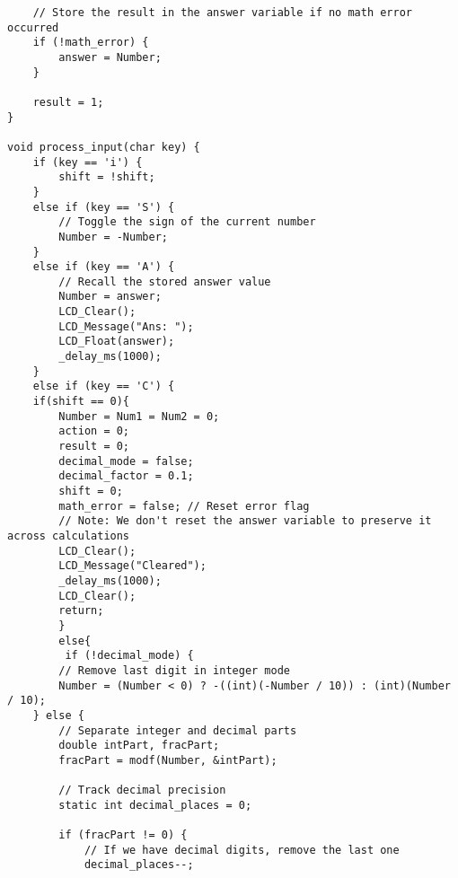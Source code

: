 \documentclass{article}
\begin{document}
\begin{verbatim}
    // Store the result in the answer variable if no math error occurred
    if (!math_error) {
        answer = Number;
    }
    
    result = 1;
}

void process_input(char key) {
    if (key == 'i') {
        shift = !shift;
    }
    else if (key == 'S') {
        // Toggle the sign of the current number
        Number = -Number;
    }
    else if (key == 'A') {
        // Recall the stored answer value
        Number = answer;
        LCD_Clear();
        LCD_Message("Ans: ");
        LCD_Float(answer);
        _delay_ms(1000);
    }
    else if (key == 'C') {
    if(shift == 0){
        Number = Num1 = Num2 = 0;
        action = 0;
        result = 0;
        decimal_mode = false;
        decimal_factor = 0.1;
        shift = 0;
        math_error = false; // Reset error flag
        // Note: We don't reset the answer variable to preserve it across calculations
        LCD_Clear();
        LCD_Message("Cleared");
        _delay_ms(1000);
        LCD_Clear();
        return;
        }
        else{
         if (!decimal_mode) {
        // Remove last digit in integer mode
        Number = (Number < 0) ? -((int)(-Number / 10)) : (int)(Number / 10);
    } else {
        // Separate integer and decimal parts
        double intPart, fracPart;
        fracPart = modf(Number, &intPart);
        
        // Track decimal precision
        static int decimal_places = 0;
        
        if (fracPart != 0) {
            // If we have decimal digits, remove the last one
            decimal_places--;
            

\end{verbatim}
\end{document}
